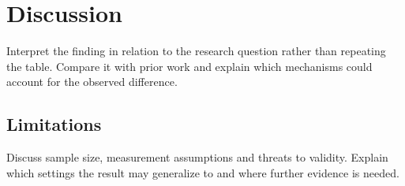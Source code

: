 \section{Discussion}
Interpret the finding in relation to the research question rather than repeating
the table. Compare it with prior work and explain which mechanisms could account
for the observed difference.
\subsection{Limitations}
Discuss sample size, measurement assumptions and threats to validity. Explain
which settings the result may generalize to and where further evidence is needed.
